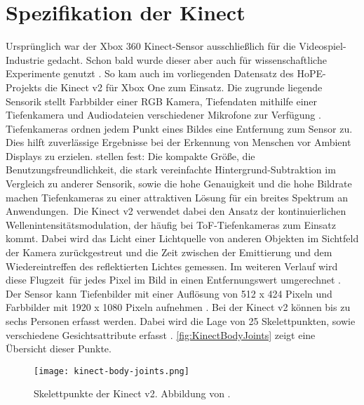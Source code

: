 \section{Spezifikation der Kinect}
\label{2-SpezifikationKinect}
Ursprünglich war der Xbox 360 Kinect-Sensor ausschließlich für die Videospiel-Industrie gedacht.
Schon bald wurde dieser aber auch für wissenschaftliche Experimente genutzt \citep{tolgyessy_evaluation_2021}.
So kam auch im vorliegenden Datensatz des HoPE-Projekts die Kinect v2 für Xbox One zum Einsatz.
Die zugrunde liegende Sensorik stellt Farbbilder einer \ac{RGB} Kamera, Tiefendaten mithilfe einer Tiefenkamera
und Audiodateien verschiedener Mikrofone zur Verfügung \citep{windows-developer-center_microsoft_corporation_human_2014}.
Tiefenkameras ordnen jedem Punkt eines Bildes eine Entfernung zum Sensor zu.
Dies hilft zuverlässige Ergebnisse bei der Erkennung von Menschen vor Ambient Displays zu erzielen.
\citet{li_time-flight_2014} stellen fest:
\glqq Die kompakte Größe, die Benutzungsfreundlichkeit,
die stark vereinfachte Hintergrund-Subtraktion im Vergleich zu anderer Sensorik, sowie die hohe Genauigkeit
und die hohe Bildrate machen Tiefenkameras zu einer attraktiven Lösung für ein breites Spektrum an Anwendungen.\grqq\
Die Kinect v2 verwendet dabei den Ansatz der kontinuierlichen Wellenintensitätsmodulation,
der häufig bei \ac{ToF}-Tiefenkameras zum Einsatz kommt.
Dabei wird das Licht einer Lichtquelle von anderen Objekten im Sichtfeld der Kamera zurückgestreut
und die Zeit zwischen der Emittierung und dem Wiedereintreffen des reflektierten Lichtes gemessen.
Im weiteren Verlauf wird diese \glqq Flugzeit\grqq\ für jedes Pixel im Bild in einen Entfernungswert umgerechnet \citep{tolgyessy_evaluation_2021}.
Der Sensor kann Tiefenbilder mit einer Auflösung von 512 x 424 Pixeln
und Farbbilder mit 1920 x 1080 Pixeln aufnehmen \citep{marin_multi-camera_2019}.
Bei der Kinect v2 können bis zu sechs Personen erfasst werden.
Dabei wird die Lage von 25 Skelettpunkten, sowie verschiedene Gesichtsattribute erfasst \citep{windows-developer-center_microsoft_corporation_human_2014}.
\autoref{fig:KinectBodyJoints} zeigt eine Übersicht dieser Punkte. 
\begin{figure}[ht]
  \begin{center}
  \texttt{[image: kinect-body-joints.png]}
  \end{center}
  \caption{Skelettpunkte der Kinect v2. Abbildung von \citet{windows-developer-center_microsoft_corporation_human_2014}.}
  \label{fig:KinectBodyJoints}
\end{figure}

